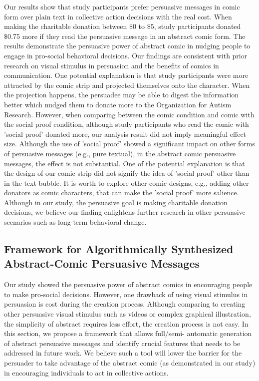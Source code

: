 Our results show that study participants prefer persuasive messages in comic form over plain text in collective action decisions with the real cost. When making the charitable donation between $\$0$ to $\$5$, study participants donated $\$ 0.75$ more if they read the persuasive message in an abstract comic form. The results demonstrate the persuasive power of abstract comic in nudging people to engage in pro-social behavioral decisions. Our findings are consistent with prior research on visual stimulus in persuasion and the benefits of comics in communication. One potential explanation is that study participants were more attracted by the comic strip and projected themselves onto the character. When the projection happens, the persuadee may be able to digest the information better which nudged them to donate more to the  Organization for Autism Research. However, when comparing between the comic condition and comic with the social proof condition, although study participants who read the comic with 'social proof' donated more, our analysis result did not imply meaningful effect size. Although the use of 'social proof' showed a significant impact on other forms of persuasive messages (e.g., pure textual), in the abstract comic persuasive messages, the effect is not substantial. One of the potential explanation is that the design of our comic strip did not signify the idea of 'social proof' other than in the text bubble. It is worth to explore other comic designs, e.g., adding other donators as comic characters, that can make the 'social proof' more salience. Although in our study, the persuasive goal is making charitable donation decisions, we believe our finding enlightens further research in other persuasive scenarios such as long-term behavioral change.

 \subsection{Framework for Algorithmically Synthesized Abstract-Comic Persuasive Messages}
 
Our study showed the persuasive power of abstract comics in encouraging people to make pro-social decisions. However, one drawback of using visual stimulus in persuasion is cost during the creation process. Although comparing to creating other persuasive visual stimulus such as videos or complex graphical illustration, the simplicity of abstract requires less effort, the creation process is not easy. In this section, we propose a framework that allows full/semi- automatic generation of abstract persuasive messages and identify crucial features that needs to be addressed in future work. We believe such a tool will lower the barrier for the persuader to take advantage of the abstract comic (as demonstrated in our study) in encouraging individuals to act in collective actions.

